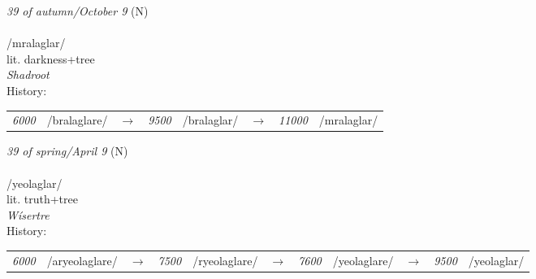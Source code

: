 \vspace{15pt}
\begin{nopagebreak}
 \textit{39 of autumn/October 9} (N)\\
\\
\noindent /mral{\textprimstress}aglar/\\
\noindent lit. darkness+tree\\
\noindent \textit{Shadroot}\\


\noindent History:

\vspace{-0pt}
\hspace{40pt}
\begin{tabular}{ccc}
\textit{6000} & /bralaglare/&$\rightarrow$ & \textit{9500} & /bralaglar/&$\rightarrow$ & \textit{11000} & /mralaglar/& \\
\end{tabular}

\vspace{20pt}\hline

\end{nopagebreak}
\filbreak



\vspace{15pt}
\begin{nopagebreak}
 \textit{39 of spring/April 9} (N)\\
\\
\noindent /yeol{\textprimstress}aglar/\\
\noindent lit. truth+tree\\
\noindent \textit{Wísertre}\\


\noindent History:

\vspace{-0pt}
\hspace{40pt}
\begin{tabular}{ccc}
\textit{6000} & /aryeolaglare/&$\rightarrow$ & \textit{7500} & /ryeolaglare/&$\rightarrow$ & \textit{7600} & /yeolaglare/&$\rightarrow$ & \textit{9500} & /yeolaglar/& \\
\end{tabular}

\vspace{20pt}\hline

\end{nopagebreak}
\filbreak



